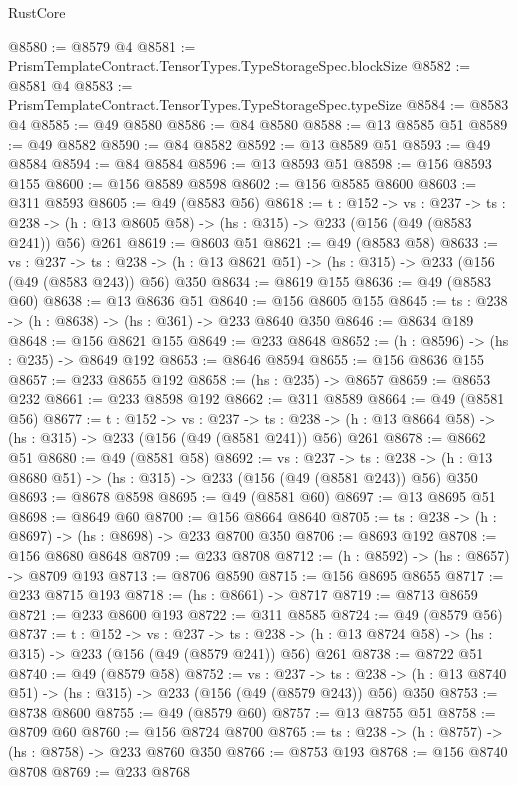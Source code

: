 \begin{lexlean}{RustCore}
\begin{coremodule}
@8580 := @8579 @4
@8581 := PrismTemplateContract.TensorTypes.TypeStorageSpec.blockSize
@8582 := @8581 @4
@8583 := PrismTemplateContract.TensorTypes.TypeStorageSpec.typeSize
@8584 := @8583 @4
@8585 := @49 @8580
@8586 := @84 @8580
@8588 := @13 @8585 @51
@8589 := @49 @8582
@8590 := @84 @8582
@8592 := @13 @8589 @51
@8593 := @49 @8584
@8594 := @84 @8584
@8596 := @13 @8593 @51
@8598 := @156 @8593 @155
@8600 := @156 @8589 @8598
@8602 := @156 @8585 @8600
@8603 := @311 @8593
@8605 := @49 (@8583 @56)
@8618 := {t : @152} ->
  {vs : @237} ->
  {ts : @238} -> (h : @13 @8605 @58) -> (hs : @315) -> @233 (@156 (@49 (@8583 @241)) @56) @261
@8619 := @8603 @51
@8621 := @49 (@8583 @58)
@8633 := {vs : @237} ->
  {ts : @238} -> (h : @13 @8621 @51) -> (hs : @315) -> @233 (@156 (@49 (@8583 @243)) @56) @350
@8634 := @8619 @155
@8636 := @49 (@8583 @60)
@8638 := @13 @8636 @51
@8640 := @156 @8605 @155
@8645 := {ts : @238} -> (h : @8638) -> (hs : @361) -> @233 @8640 @350
@8646 := @8634 @189
@8648 := @156 @8621 @155
@8649 := @233 @8648
@8652 := (h : @8596) -> (hs : @235) -> @8649 @192
@8653 := @8646 @8594
@8655 := @156 @8636 @155
@8657 := @233 @8655 @192
@8658 := (hs : @235) -> @8657
@8659 := @8653 @232
@8661 := @233 @8598 @192
@8662 := @311 @8589
@8664 := @49 (@8581 @56)
@8677 := {t : @152} ->
  {vs : @237} ->
  {ts : @238} -> (h : @13 @8664 @58) -> (hs : @315) -> @233 (@156 (@49 (@8581 @241)) @56) @261
@8678 := @8662 @51
@8680 := @49 (@8581 @58)
@8692 := {vs : @237} ->
  {ts : @238} -> (h : @13 @8680 @51) -> (hs : @315) -> @233 (@156 (@49 (@8581 @243)) @56) @350
@8693 := @8678 @8598
@8695 := @49 (@8581 @60)
@8697 := @13 @8695 @51
@8698 := @8649 @60
@8700 := @156 @8664 @8640
@8705 := {ts : @238} -> (h : @8697) -> (hs : @8698) -> @233 @8700 @350
@8706 := @8693 @192
@8708 := @156 @8680 @8648
@8709 := @233 @8708
@8712 := (h : @8592) -> (hs : @8657) -> @8709 @193
@8713 := @8706 @8590
@8715 := @156 @8695 @8655
@8717 := @233 @8715 @193
@8718 := (hs : @8661) -> @8717
@8719 := @8713 @8659
@8721 := @233 @8600 @193
@8722 := @311 @8585
@8724 := @49 (@8579 @56)
@8737 := {t : @152} ->
  {vs : @237} ->
  {ts : @238} -> (h : @13 @8724 @58) -> (hs : @315) -> @233 (@156 (@49 (@8579 @241)) @56) @261
@8738 := @8722 @51
@8740 := @49 (@8579 @58)
@8752 := {vs : @237} ->
  {ts : @238} -> (h : @13 @8740 @51) -> (hs : @315) -> @233 (@156 (@49 (@8579 @243)) @56) @350
@8753 := @8738 @8600
@8755 := @49 (@8579 @60)
@8757 := @13 @8755 @51
@8758 := @8709 @60
@8760 := @156 @8724 @8700
@8765 := {ts : @238} -> (h : @8757) -> (hs : @8758) -> @233 @8760 @350
@8766 := @8753 @193
@8768 := @156 @8740 @8708
@8769 := @233 @8768

\end{coremodule}
\end{lexlean}
